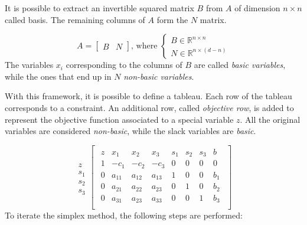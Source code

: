 It is possible to extract an invertible squared matrix $B$ from $A$ of dimension $n \times n$ called basis.
The remaining columns of $A$ form the $N$ matrix.

\begin{equation*}
    A = \begin{bmatrix}
        B & N
    \end{bmatrix}
    \text{, where }
    \begin{cases}
        B \in \mathbb{R}^{n \times n} \\
        N \in \mathbb{R}^{n \times (d - n)}
    \end{cases}
\end{equation*}
The variables $x_i$ corresponding to the columns of $B$ are called \textit{basic variables}, while the ones that end up in $N$ \textit{non-basic variables}.

With this framework, it is possible to define a tableau.
Each row of the tableau corresponds to a constraint.
An additional row, called \textit{objective row}, is added to represent the objective function associated to a special variable $z$.
All the original variables are considered \textit{non-basic}, while the slack variables are \textit{basic}.

\begin{equation*}
    \begin{array}{c}
        \\
        z   \\
        s_1 \\
        s_2 \\
        s_3
    \end{array}
    \begin{bmatrix}
        \begin{array}{c|cccccc|c}
            z & x_1    & x_2    & x_3    & s_1 & s_2 & s_3 & b   \\ \hline
            1 & -c_1   & -c_2   & -c_3   & 0   & 0   & 0   & 0   \\ \hline
            0 & a_{11} & a_{12} & a_{13} & 1   & 0   & 0   & b_1 \\
            0 & a_{21} & a_{22} & a_{23} & 0   & 1   & 0   & b_2 \\
            0 & a_{31} & a_{23} & a_{33} & 0   & 0   & 1   & b_3 \\
        \end{array}
    \end{bmatrix}
\end{equation*}
To iterate the simplex method, the following steps are performed:

